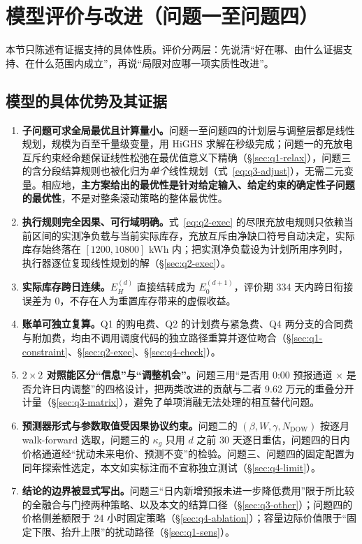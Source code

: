 
\section{模型评价与改进（问题一至问题四）}

本节只陈述有证据支持的具体性质。评价分两层：先说清``好在哪、由什么证据支持、在什么范围内成立''，再说``局限对应哪一项实质性改进''。

\subsection{模型的具体优势及其证据}

\begin{enumerate}
  \item \textbf{子问题可求全局最优且计算量小。}问题一至问题四的计划层与调整层都是线性规划，规模为百至千量级变量，用 HiGHS 求解在秒级完成；问题一的充放电互斥约束经命题保证线性松弛在最优值意义下精确（\S\ref{sec:q1-relax}），问题三的含分段结算规则也被化归为\emph{单个}线性规划（式~\eqref{eq:q3-adjust}），无需二元变量。相应地，{\bfseries 主方案给出的最优性是针对给定输入、给定约束的确定性子问题的最优性}，不是对整条滚动策略的整体最优性。
  \item \textbf{执行规则完全因果、可行域明确。}式~\eqref{eq:q2-exec} 的尽限充放电规则只依赖当前区间的实测净负载与当前实际库存，充放互斥由净缺口符号自动决定，实际库存始终落在 $[1200,10800]$ kWh 内；把实测净负载设为计划所用序列时，执行器逐位复现线性规划的解（\S\ref{sec:q2-exec}）。
  \item \textbf{实际库存跨日连续。}$E_H^{(d)}$ 直接结转成为 $E_0^{(d+1)}$，评价期 334 天内跨日衔接误差为 0，不存在人为重置库存带来的虚假收益。
  \item \textbf{账单可独立复算。}Q1 的购电费、Q2 的计划费与紧急费、Q4 两分支的合同费与附加费，均由不调用调度代码的独立路径重算并逐位吻合（\S\ref{sec:q1-constraint}、\S\ref{sec:q2-exec}、\S\ref{sec:q4-check}）。
  \item \textbf{$2\times2$ 对照能区分``信息''与``调整机会''。}问题三用``是否用 0:00 预报通道 $\times$ 是否允许日内调整''的四格设计，把两类改进的贡献与二者 9.62 万元的重叠分开计量（\S\ref{sec:q3-matrix}），避免了单项消融无法处理的相互替代问题。
  \item \textbf{预测器形式与参数取值受因果协议约束。}问题二的 $(\beta,W,\gamma,N_{\mathrm{DOW}})$ 按逐月 walk-forward 选取，问题三的 $\kappa_g$ 只用 $d$ 之前 30 天逐日重估，问题四的日内价格通道经``扰动未来电价、预测不变''的检验。问题三、问题四的固定配置为同年探索性选定，本文如实标注而不宣称独立测试（\S\ref{sec:q4-limit}）。
  \item \textbf{结论的边界被显式写出。}问题三``日内新增预报未进一步降低费用''限于所比较的全融合与门控两种策略、以及本文的结算口径（\S\ref{sec:q3-other}）；问题四的价格侧差额限于 24 小时固定策略（\S\ref{sec:q4-ablation}）；容量边际价值限于``固定下限、抬升上限''的扰动路径（\S\ref{sec:q1-sens}）。
\end{enumerate}

